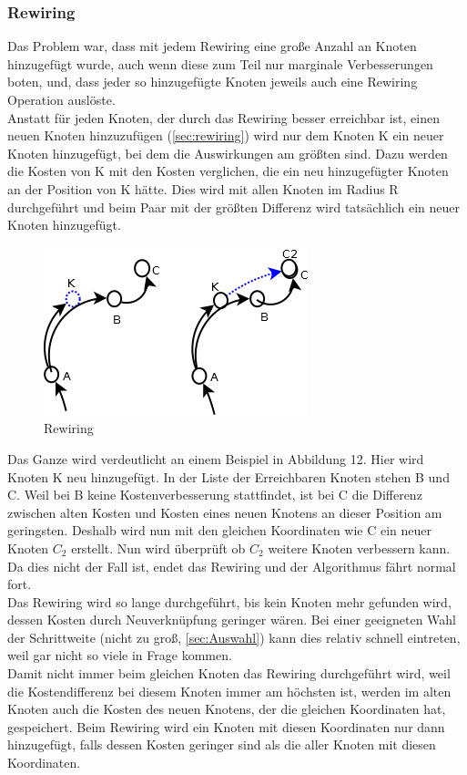 \subsubsection{Rewiring}
Das Problem war, dass mit jedem Rewiring eine große Anzahl an Knoten hinzugefügt wurde, auch wenn diese zum Teil nur marginale Verbesserungen boten, und, dass jeder so hinzugefügte Knoten jeweils auch eine Rewiring Operation auslöste.\\
Anstatt für jeden Knoten, der durch das Rewiring besser erreichbar ist, einen neuen Knoten hinzuzufügen (\ref{sec:rewiring}) wird nur dem Knoten K ein neuer Knoten hinzugefügt, bei dem die Auswirkungen am größten sind. Dazu werden die Kosten von K mit den Kosten verglichen, die ein neu hinzugefügter Knoten an der Position von K hätte. Dies wird mit allen Knoten im Radius R durchgeführt und beim Paar mit der größten Differenz wird tatsächlich ein neuer Knoten hinzugefügt. \\
\begin{figure}
\label{fig:rewiring4}
\centering
\includegraphics[scale=1]{Bilder/Rewiring.png} 
\caption{Rewiring}
\end{figure}
Das Ganze wird verdeutlicht an einem Beispiel in Abbildung 12. Hier wird Knoten K neu hinzugefügt. In der Liste der Erreichbaren Knoten stehen B und C. Weil bei B keine Kostenverbesserung stattfindet, ist bei C die Differenz zwischen alten Kosten und Kosten eines neuen Knotens an dieser Position am geringsten. Deshalb wird nun mit den gleichen Koordinaten wie C ein neuer Knoten $C_2$ erstellt. Nun wird überprüft ob $C_2$ weitere Knoten verbessern kann. Da dies nicht der Fall ist, endet das Rewiring und der Algorithmus fährt normal fort.\\
Das Rewiring wird so lange durchgeführt, bis kein Knoten mehr gefunden wird, dessen Kosten durch Neuverknüpfung geringer wären. Bei einer geeigneten Wahl der Schrittweite (nicht zu groß, \ref{sec:Auswahl}) kann dies relativ schnell eintreten, weil gar nicht so viele in Frage kommen. \\
Damit nicht immer beim gleichen Knoten das Rewiring durchgeführt wird, weil die Kostendifferenz bei diesem Knoten immer am höchsten ist, werden im alten Knoten auch die Kosten des neuen Knotens, der die gleichen Koordinaten hat, gespeichert. Beim Rewiring wird ein Knoten mit diesen Koordinaten nur dann hinzugefügt, falls dessen Kosten geringer sind als die aller Knoten mit diesen Koordinaten.

